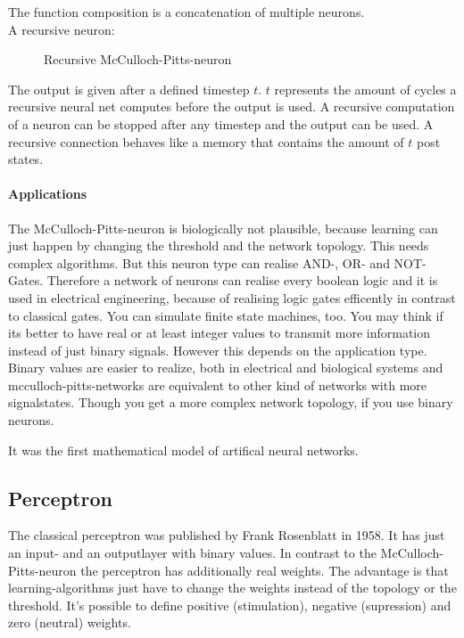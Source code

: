 \documentclass[10pt,a4paper,DIV=11]{scrreprt}
\begin{document}
The function composition is a concatenation of multiple neurons. \\

A recursive neuron:

\begin{figure}[H]
	\centering
	\caption{Recursive McCulloch-Pitts-neuron}
	\label{fig:pitts3}
\end{figure}

The output is given after a defined timestep $t$. $t$ represents the amount of cycles a recursive neural net computes before the output is used. A recursive computation of a neuron can be stopped after any  timestep and the output can be used. A recursive connection behaves like a memory that contains the amount of $t$ post states.

\paragraph{Applications}
The McCulloch-Pitts-neuron is biologically not plausible, because learning
can just happen by changing the threshold and the network topology. This needs complex algorithms.
But this neuron type can realise AND-, OR- and NOT-Gates.
Therefore a network of neurons can realise every boolean logic and it is used in electrical engineering, because of realising logic gates efficently in contrast to classical gates. You can simulate finite state machines, too.
You may think if its better to have real or at least integer values to transmit more information instead of just binary signals. However this depends on the application type. Binary values are easier to realize, both in electrical and biological systems and mcculloch-pitts-networks are equivalent to other kind of networks with more signalstates. Though you get a more complex network topology, if you use binary neurons.

It was the first mathematical model of artifical neural networks.


\subsection{Perceptron}
The classical perceptron was published by Frank Rosenblatt in 1958.
It has just an input- and an outputlayer with binary values. In contrast to the McCulloch-Pitts-neuron
the perceptron has additionally real weights. The advantage is that learning-algorithms just have to change the weights instead of the topology or the threshold. It's possible to define positive (stimulation), negative (supression) and zero (neutral) weights.
\end{document}
